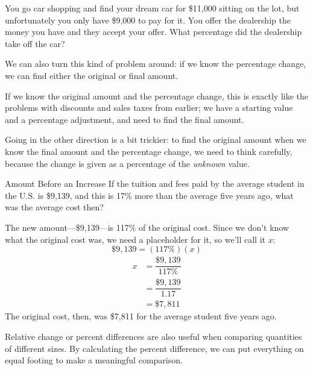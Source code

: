 \begin{try}
You go car shopping and find your dream car for \$11,000 sitting on the lot, but unfortunately you only have \$9,000 to pay for it.  You offer the dealership the money you have and they accept your offer.  What percentage did the dealership take off the car?
\end{try}

We can also turn this kind of problem around: if we know the percentage change, we can find either the original or final amount.

If we know the original amount and the percentage change, this is exactly like the problems with discounts and sales taxes from earlier; we have a starting value and a percentage adjustment, and need to find the final amount.

Going in the other direction is a bit trickier: to find the original amount when we know the final amount and the percentage change, we need to think carefully, because the change is given as a percentage of the \emph{unknown} value.

\begin{example}{Amount Before an Increase}
If the tuition and fees paid by the average student in the U.S. is \$9,139, and this is 17\% more than the average five years ago, what was the average cost then?

\solline

The new amount---\$9,139---is 117\% of the original cost.  Since we don't know what the original cost was, we need a placeholder for it, so we'll call it $x$:
\[\$9,139 = (117\%)(x)\]
\begin{align*}
x &= \dfrac{\$9,139}{117\%}\\
&= \dfrac{\$9,139}{1.17}\\
&= \boxed{\$7,811}
\end{align*}
The original cost, then, was \$7,811 for the average student five years ago.
\end{example}

Relative change or percent differences are also useful when comparing quantities of different sizes.  By calculating the percent difference, we can put everything on equal footing to make a meaningful comparison.

